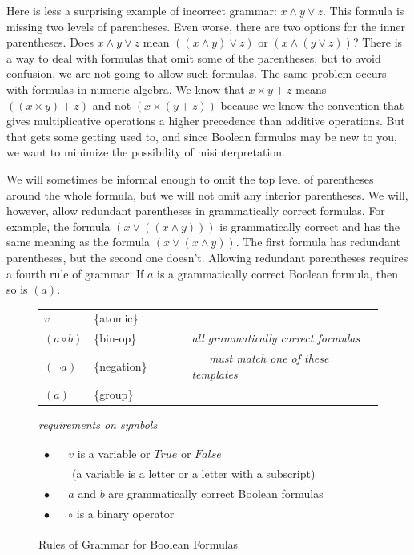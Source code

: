 Here is less a surprising example of incorrect grammar: $x \wedge y \vee z$. This formula is missing two levels of parentheses. Even worse, there are two options for the inner parentheses. Does $x \wedge y \vee z$ mean $((x \wedge y) \vee z)$ or $(x \wedge (y \vee z))$? There is a way to deal with formulas that omit some of the parentheses, but to avoid confusion, we are not going to allow such formulas. The same problem occurs with formulas in numeric algebra. We know that $x \times y + z$ means $((x \times y) + z)$ and not $(x \times (y + z))$ because we know the convention that gives multiplicative operations a higher precedence than additive operations. But that gets some getting used to, and since Boolean formulas may be new to you, we want to minimize the possibility of misinterpretation.

We will sometimes be informal enough to omit the top level of parentheses around the whole formula, but we will not omit any interior parentheses.
We will, however, allow redundant parentheses in grammatically correct formulas. For example, the formula $(x \vee ((x \wedge y)))$ is grammatically correct and has the same meaning as the formula $(x \vee (x \wedge y))$. The first formula has redundant parentheses, but the second one doesn't.
Allowing redundant parentheses requires a fourth rule of grammar:
If $a$ is a grammatically correct Boolean formula, then so is $(a)$.

\begin{figure}
\begin{center}
\begin{tabular}{llll}
$v$             & \{atomic\}    &~~~~& \\
$(a \circ b)$   & \{bin-op\}    &~~~~& \emph{all grammatically correct formulas} \\
$(\neg a)$      & \{negation\}  &~~~~& \emph{~~~must match one of these templates}  \\
$(a)$           & \{group\}     &~~~~& \\
\end{tabular}

\vspace{2 mm}

\emph{requirements on symbols}

\begin{tabular}{l}
\hline
$\bullet$ ~~ $v$ is a variable or $True$ or $False$ \\
~~~~~(a variable is a letter or a letter with a subscript) \\
$\bullet$ ~~ $a$ and $b$ are grammatically correct Boolean formulas \\
$\bullet$ ~~ $\circ$ is a binary operator \\
\hline
\end{tabular}
\end{center}
\caption{Rules of Grammar for Boolean Formulas}
\label{fig-02-grammar}
\end{figure}

